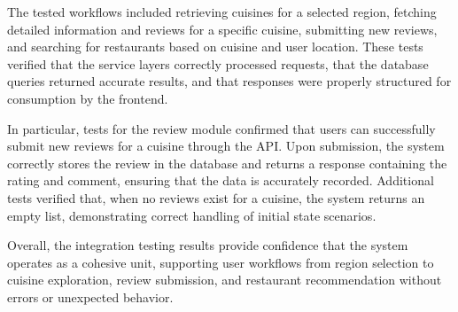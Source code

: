 The tested workflows included retrieving cuisines for a selected region, 
fetching detailed information and reviews for a specific cuisine, 
submitting new reviews, and searching for restaurants based on cuisine 
and user location. These tests verified that the service layers correctly 
processed requests, that the database queries returned accurate results, 
and that responses were properly structured for consumption by the frontend.

In particular, tests for the review module confirmed that users can successfully 
submit new reviews for a cuisine through the API. Upon submission, the system 
correctly stores the review in the database and returns a response containing 
the rating and comment, ensuring that the data is accurately recorded. 
Additional tests verified that, when no reviews exist for a cuisine, 
the system returns an empty list, demonstrating correct handling of 
initial state scenarios.

Overall, the integration testing results provide confidence that the system 
operates as a cohesive unit, supporting user workflows from region selection 
to cuisine exploration, review submission, and restaurant recommendation 
without errors or unexpected behavior.